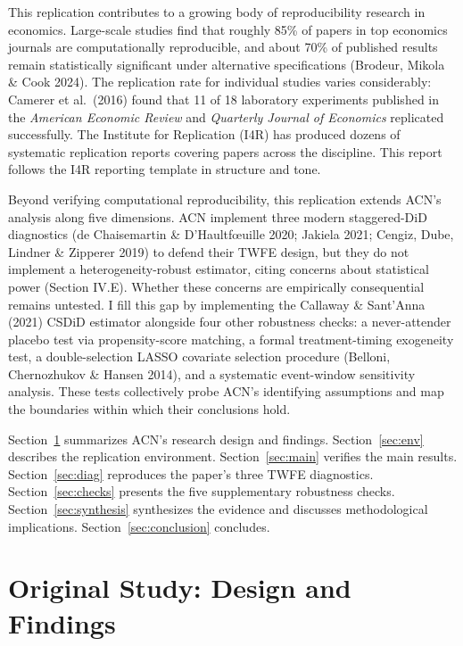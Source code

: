 \documentclass[12pt,a4paper]{article}
\begin{document}
This replication contributes to a growing body of reproducibility research in economics. Large-scale studies find that roughly 85\% of papers in top economics journals are computationally reproducible, and about 70\% of published results remain statistically significant under alternative specifications (Brodeur, Mikola \& Cook 2024). The replication rate for individual studies varies considerably: Camerer et al.\ (2016) found that 11 of 18 laboratory experiments published in the \textit{American Economic Review} and \textit{Quarterly Journal of Economics} replicated successfully. The Institute for Replication (I4R) has produced dozens of systematic replication reports covering papers across the discipline. This report follows the I4R reporting template in structure and tone.

Beyond verifying computational reproducibility, this replication extends ACN's analysis along five dimensions. ACN implement three modern staggered-DiD diagnostics (de Chaisemartin \& D'Haultf{\oe}uille 2020; Jakiela 2021; Cengiz, Dube, Lindner \& Zipperer 2019) to defend their TWFE design, but they do not implement a heterogeneity-robust estimator, citing concerns about statistical power (Section IV.E). Whether these concerns are empirically consequential remains untested. I fill this gap by implementing the Callaway \& Sant'Anna (2021) CSDiD estimator alongside four other robustness checks: a never-attender placebo test via propensity-score matching, a formal treatment-timing exogeneity test, a double-selection LASSO covariate selection procedure (Belloni, Chernozhukov \& Hansen 2014), and a systematic event-window sensitivity analysis. These tests collectively probe ACN's identifying assumptions and map the boundaries within which their conclusions hold.

Section~\ref{sec:original} summarizes ACN's research design and findings. Section~\ref{sec:env} describes the replication environment. Section~\ref{sec:main} verifies the main results. Section~\ref{sec:diag} reproduces the paper's three TWFE diagnostics. Section~\ref{sec:checks} presents the five supplementary robustness checks. Section~\ref{sec:synthesis} synthesizes the evidence and discusses methodological implications. Section~\ref{sec:conclusion} concludes.

\section{Original Study: Design and Findings}
\label{sec:original}
\end{document}
